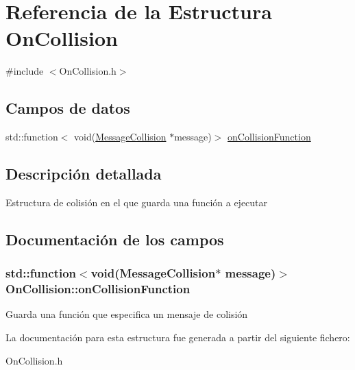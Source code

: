 \hypertarget{structOnCollision}{}\section{Referencia de la Estructura On\+Collision}
\label{structOnCollision}


{\ttfamily \#include $<$On\+Collision.\+h$>$}

\subsection*{Campos de datos}
\begin{DoxyCompactItemize}
\item 
std\+::function$<$ void(\hyperlink{structMessageCollision}{Message\+Collision} $\ast$message)$>$ \hyperlink{structOnCollision_ab2d10451b054b4a5306517de28d85903}{on\+Collision\+Function}
\end{DoxyCompactItemize}


\subsection{Descripción detallada}
Estructura de colisión en el que guarda una función a ejecutar 

\subsection{Documentación de los campos}
\hypertarget{structOnCollision_ab2d10451b054b4a5306517de28d85903}{}
\subsubsection[{on\+Collision\+Function}]{\setlength{\rightskip}{0pt plus 5cm}std\+::function$<$void({\bf Message\+Collision}$\ast$ message)$>$ On\+Collision\+::on\+Collision\+Function}\label{structOnCollision_ab2d10451b054b4a5306517de28d85903}
Guarda una función que especifica un mensaje de colisión 

La documentación para esta estructura fue generada a partir del siguiente fichero\+:\begin{DoxyCompactItemize}
\item 
On\+Collision.\+h\end{DoxyCompactItemize}
